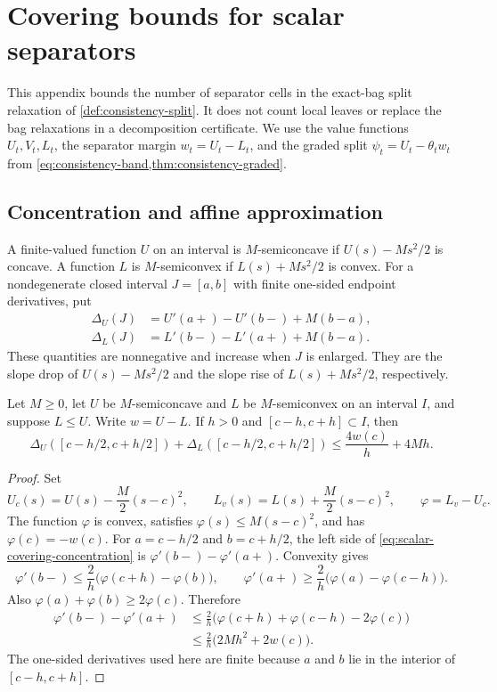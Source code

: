 \section{Covering bounds for scalar separators}
\label{sec:scalar-covering}

This appendix bounds the number of separator cells in the exact-bag
split relaxation of \cref{def:consistency-split}.  It does not count local
leaves or replace the bag relaxations in a decomposition certificate.
We use the value functions $U_t,V_t,L_t$, the separator margin
$w_t=U_t-L_t$, and the graded split
$\psi_t=U_t-\theta_t w_t$ from
\cref{eq:consistency-band,thm:consistency-graded}.

\subsection{Concentration and affine approximation}

A finite-valued function $U$ on an interval is $M$-semiconcave if
$U(s)-Ms^2/2$ is concave.  A function $L$ is $M$-semiconvex if
$L(s)+Ms^2/2$ is convex.  For a nondegenerate closed interval
$J=[a,b]$ with finite one-sided endpoint derivatives, put
\begin{align}
 \Delta_U(J)&=U'(a+)-U'(b-)+M(b-a),\\
 \Delta_L(J)&=L'(b-)-L'(a+)+M(b-a).
 \label{eq:scalar-covering-slope-mass}
\end{align}
These quantities are nonnegative and increase when $J$ is enlarged.
They are the slope drop of $U(s)-Ms^2/2$ and the slope rise of
$L(s)+Ms^2/2$, respectively.

\begin{lemma}
\label{lem:scalar-covering-concentration}
Let $M\geq0$, let $U$ be $M$-semiconcave and $L$ be
$M$-semiconvex on an interval $I$, and suppose $L\leq U$.
Write $w=U-L$.  If $h>0$ and $[c-h,c+h]\subset I$, then
\begin{equation}
 \Delta_U([c-h/2,c+h/2])+
 \Delta_L([c-h/2,c+h/2])
 \leq \frac{4w(c)}h+4Mh.
 \label{eq:scalar-covering-concentration}
\end{equation}
\end{lemma}

\begin{proof}
Set
\[
 U_c(s)=U(s)-\frac M2(s-c)^2,
 \qquad L_v(s)=L(s)+\frac M2(s-c)^2,
 \qquad \varphi=L_v-U_c.
\]
The function $\varphi$ is convex, satisfies
$\varphi(s)\leq M(s-c)^2$, and has $\varphi(c)=-w(c)$.
For $a=c-h/2$ and $b=c+h/2$, the left side of
\eqref{eq:scalar-covering-concentration} is
$\varphi'(b-)-\varphi'(a+)$.  Convexity gives
\[
 \varphi'(b-)\leq\frac{2}{h}\bigl(\varphi(c+h)-\varphi(b)\bigr),
 \qquad
 \varphi'(a+)\geq\frac{2}{h}\bigl(\varphi(a)-\varphi(c-h)\bigr).
\]
Also $\varphi(a)+\varphi(b)\geq2\varphi(c)$.  Therefore
\begin{align*}
 \varphi'(b-)-\varphi'(a+)
 &\leq\frac2h\bigl(\varphi(c+h)+\varphi(c-h)-2\varphi(c)\bigr)\\
 &\leq\frac2h\bigl(2Mh^2+2w(c)\bigr).
\end{align*}
The one-sided derivatives used here are finite because $a$ and $b$ lie
in the interior of $[c-h,c+h]$.
\end{proof}

